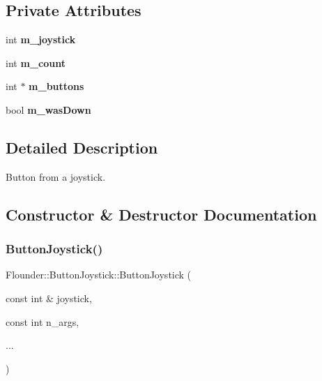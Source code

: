 \subsection*{Private Attributes}
\begin{DoxyCompactItemize}
\item 
\mbox{\label{class_flounder_1_1_button_joystick_a2e1350d93f3421eabc87082bd42c0003}} 
int {\bfseries m\+\_\+joystick}
\item 
\mbox{\label{class_flounder_1_1_button_joystick_a39488f0e4a5ab6bb8995bf360f4316ef}} 
int {\bfseries m\+\_\+count}
\item 
\mbox{\label{class_flounder_1_1_button_joystick_ab9ba674f8446ab32df22a99a631da1e1}} 
int $\ast$ {\bfseries m\+\_\+buttons}
\item 
\mbox{\label{class_flounder_1_1_button_joystick_a59b824a3abd85587a13fa3398fe20b04}} 
bool {\bfseries m\+\_\+was\+Down}
\end{DoxyCompactItemize}


\subsection{Detailed Description}
Button from a joystick. 



\subsection{Constructor \& Destructor Documentation}
\mbox{\label{class_flounder_1_1_button_joystick_ab4e619c7c9c9e368f187ee54dd71c44d}} 
\subsubsection{\texorpdfstring{Button\+Joystick()}{ButtonJoystick()}}
{\footnotesize\ttfamily Flounder\+::\+Button\+Joystick\+::\+Button\+Joystick (\begin{DoxyParamCaption}\item[{const int \&}]{joystick,  }\item[{const int}]{n\+\_\+args,  }\item[{}]{... }\end{DoxyParamCaption})}



